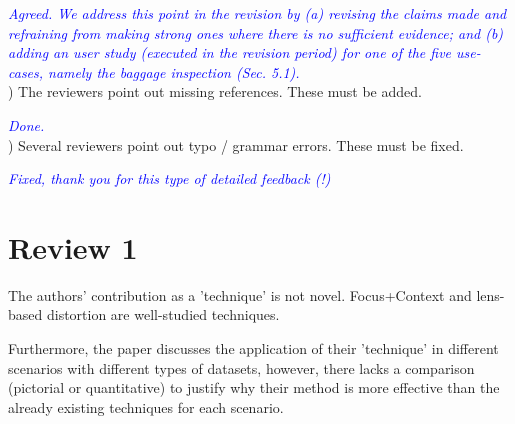 \documentclass[a4paper,10pt]{article}
\newcommand{\rr}[1]{\emph{\textcolor{blue}{#1}}}
\begin{document}
   \rr{Agreed. We address this point in the revision by (a) revising the claims made and refraining from making strong ones where there is no sufficient evidence; and (b) adding an user study (executed in the revision period) for one of the five use-cases, namely the baggage inspection (Sec. 5.1).}\\

) The reviewers point out missing references. These must be added.

    \rr{Done.}\\

) Several reviewers point out typo / grammar errors. These must be fixed.

    \rr{Fixed, thank you for this type of detailed feedback (!)}

\section{Review 1}

    The authors' contribution as a 'technique' is not novel. Focus+Context and lens-
    based distortion are well-studied techniques. 
    
    Furthermore, the paper discusses the
    application of their 'technique' in different scenarios with different types of
    datasets, however, there lacks a comparison (pictorial or quantitative) to justify
    why their method is more effective than the already existing techniques for each
    scenario. 
    
\end{document}
